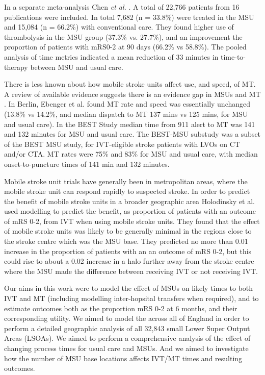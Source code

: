 In a separate meta-analysis Chen \textit{et al.} \cite{chen_systematic_2022}. A total of 22,766 patients from 16 publications were included. In total 7,682 (n = 33.8\%) were treated in the MSU and 15,084 (n = 66.2\%) with conventional care. They found higher use of thrombolysis in the MSU group (37.3\% vs. 27.7\%), and an improvement the proportion of patients with mRS0-2 at 90 days (66.2\% vs 58.8\%).  The pooled analysis of time metrics indicated a mean reduction of 33 minutes in time-to-therapy between MSU and usual care.

There is less known about how mobile stroke units affect use, and speed, of MT. A review of available evidence suggests there is an evidence gap in MSUs and MT \cite{navi_mobile_2022}. In Berlin, Ebenger et al. \cite{ebinger_association_2021} found MT rate and speed was essentially unchanged (13.8\% vs 14.2\%, and median dispatch to MT 137 mins vs 125 mins, for MSU and usual care). In the BEST Study \cite{grotta_prospective_2021} median time from 911 alert to MT was 141 and 132 minutes for MSU and usual care. The BEST-MSU substudy \cite{czap_abstract_2022} was a subset of the BEST MSU study, for IVT-eligible stroke patients with LVOs on CT and/or CTA. MT rates were 75\% and 83\% for MSU and usual care,  with median onset-to-puncture times of 141 min and 132 minutes.


Mobile stroke unit trials have generally been in metropolitan areas, where the mobile stroke unit can respond rapidly to suspected stroke. In order to predict the benefit of mobile stroke units in a broader geographic area Holodinsky et al. \cite{holodinsky_jessalyn_k_what_2020} used modelling to predict the benefit, as proportion of patients with an outcome of mRS 0-2, from IVT when using mobile stroke units. They found that the effect of mobile stroke units was likely to be generally minimal in the regions close to the stroke centre which was the MSU base. They predicted no more than 0.01 increase in the proportion of patients with an an outcome of mRS 0-2, but this could rise to about a 0.02 increase in a halo further away from the stroke centre where the MSU made the difference between receiving IVT or not receiving IVT.


Our aims in this work were to model the effect of MSUs on likely times to both IVT and MT (including modelling inter-hopsital transfers when required), and to estimate outcomes both as the proportion mRS 0-2 at 6 months, and their corresponding utility. We aimed to model the across all of England in order to perform a detailed geographic analysis of all 32,843 small Lower Super Output Areas (LSOAs). We aimed to perform a comprehensive analysis of the effect of changing process times for usual care and MSUs. And we aimed to investigate how the number of MSU base locations affects IVT/MT times and resulting outcomes.
